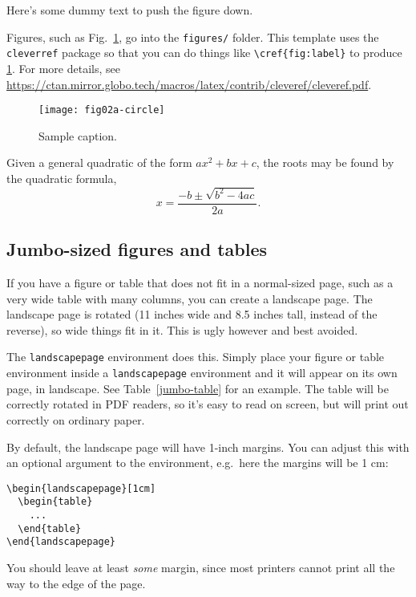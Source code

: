 \documentclass[draft]{ubcstatproposal} %
\begin{document}
Here's some dummy text to push the figure down. \lipsum[2]

Figures, such as Fig.~\ref{fig:label}, go into the \texttt{figures/} folder. This
template uses the \verb|cleverref| package so that you can do things like
\verb|\cref{fig:label}| to produce \cref{fig:label}. For more details, see 
\href{https://ctan.mirror.globo.tech/macros/latex/contrib/cleveref/cleveref.pdf}%
{https://ctan.mirror.globo.tech/macros/latex/contrib/cleveref/cleveref.pdf}.

\begin{figure}
  \centering
  \texttt{[image: fig02a-circle]}
  \caption{Sample caption.}
  \label{fig:label}
\end{figure}

Given a general quadratic of the form $ax^2 + bx + c$, the roots may be found by
the quadratic formula,
\[
  x = \frac{-b \pm \sqrt{b^2 - 4ac}}{2a}.
\]

\subsection{Jumbo-sized figures and tables}

If you have a figure or table that does not fit in a normal-sized page, such as
a very wide table with many columns, you can create a landscape page. The
landscape page is rotated (11 inches wide and 8.5 inches tall, instead of the
reverse), so wide things fit in it. This is ugly however and best avoided.

The \verb|landscapepage| environment does this. Simply place your figure or
table environment inside a \verb|landscapepage| environment and it will appear
on its own page, in landscape. See Table~\ref{jumbo-table} for an example. The
table will be correctly rotated in PDF readers, so it's easy to read on screen,
but will print out correctly on ordinary paper.

By default, the landscape page will have 1-inch margins. You can adjust this
with an optional argument to the environment, e.g.\ here the margins will be 1
cm:
\begin{verbatim}
\begin{landscapepage}[1cm]
  \begin{table}
    ...
  \end{table}
\end{landscapepage}
\end{verbatim}
You should leave at least \emph{some} margin, since most printers cannot print
all the way to the edge of the page.
\end{document}
